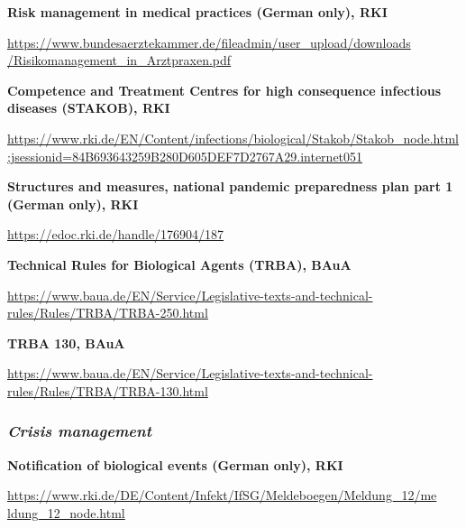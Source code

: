 \documentclass{article}
\begin{document}
\textbf{Risk management in medical practices (German only), RKI}


\href{https://www.bundesaerztekammer.de/fileadmin/user_upload/downloads/Risikomanagement_in_Arztpraxen.pdf}{https://www.bundesaerztekammer.de/fileadmin/user\_upload/downloads} \href{https://www.bundesaerztekammer.de/fileadmin/user_upload/downloads/Risikomanagement_in_Arztpraxen.pdf}{/Risikomanagement\_in\_Arztpraxen.pdf}


\textbf{Competence and Treatment Centres for high consequence infectious diseases (STAKOB), RKI}


\href{https://www.rki.de/EN/Content/infections/biological/Stakob/Stakob_node.html;jsessionid=84B693643259B280D605DEF7D2767A29.internet051}{https://www.rki.de/EN/Content/infections/biological/Stakob/Stakob\_node.html;jsessionid=84B693643259B280D605DEF7D2767A29.internet051}


\textbf{Structures and measures, national pandemic preparedness plan part 1 (German only), RKI }


\href{https://edoc.rki.de/handle/176904/187}{https://edoc.rki.de/handle/176904/187}


\textbf{Technical Rules for Biological Agents (TRBA), BAuA}


\href{https://www.baua.de/EN/Service/Legislative-texts-and-technical-rules/Rules/TRBA/TRBA.html}{https://www.baua.de/EN/Service/Legislative-texts-and-technical-rules/Rules/TRBA/TRBA-250.html}


\textbf{TRBA 130, BAuA }


\href{https://www.baua.de/EN/Service/Legislative-texts-and-technical-rules/Rules/TRBA/TRBA-130.html}{https://www.baua.de/EN/Service/Legislative-texts-and-technical-rules/Rules/TRBA/TRBA-130.html}




\subsubsection{\emph{\textbf{Crisis management}}}\label{H8778968}



\textbf{Notification of biological events (German only), RKI}


\href{https://www.rki.de/DE/Content/Infekt/IfSG/Meldeboegen/Meldung_12/meldung_12_node.html}{https://www.rki.de/DE/Content/Infekt/IfSG/Meldeboegen/Meldung\_12/me} \href{https://www.rki.de/DE/Content/Infekt/IfSG/Meldeboegen/Meldung_12/meldung_12_node.html}{ldung\_12\_node.html}
\end{document}
